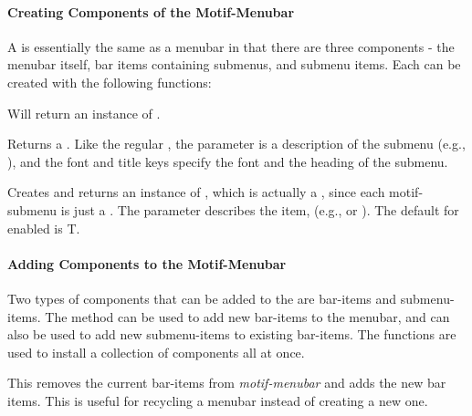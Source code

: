 \paragraph{Creating Components of the Motif-Menubar}

A  is essentially the same as a menubar in that there are
three components - the menubar itself, bar items containing submenus,
and submenu items.  Each can be created with the following functions:


Will return an instance of .


Returns a .  Like the regular , the 
parameter is a description of the submenu (e.g., ), and the font and title keys specify
the font and the heading of the submenu.


Creates and returns an instance of , which is
actually a , since each motif-submenu is just a
.  The  parameter describes the item, (e.g.,
 or ).  The default for enabled is T.


\paragraph{Adding Components to the Motif-Menubar}

Two types of components that can be added to the  are
bar-items and submenu-items.  The  method can be used to add
new bar-items to the menubar, and can also be used to add new submenu-items
to existing bar-items.  The  functions are used to
install a collection of components all at once.


This removes the current bar-items from {\it motif-menubar} and adds the
new bar items.  This is useful for recycling a menubar instead of creating
a new one.

